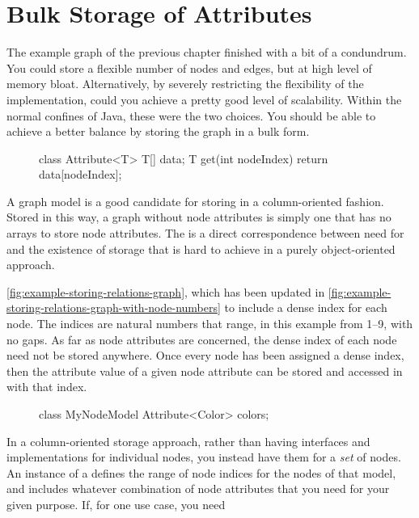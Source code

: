 \section{Bulk Storage of Attributes}

The example graph of the previous chapter finished with a bit of a condundrum.
You could store a flexible number of nodes and edges, but at high level of
memory bloat. Alternatively, by severely restricting the flexibility of the
implementation, could you achieve a pretty good level of scalability. Within the
normal confines of Java, these were the two choices. You should be able to
achieve a better balance by storing the graph in a bulk form.

\begin{figure}
\vspace{-2mm}
\begin{framedlisting}
class Attribute<T> {
  T[] data;
  T get(int nodeIndex) {
     return data[nodeIndex];
  }
}
\end{framedlisting}
\end{figure}
A graph model is a good candidate for storing in a column-oriented fashion.
Stored in this way, a graph without node attributes is simply one that has no
arrays to store node attributes. The is a direct correspondence between need for
and the existence of storage that is hard to achieve in a purely object-oriented
approach.

\autoref{fig:example-storing-relations-graph}, which has been updated in
\autoref{fig:example-storing-relations-graph-with-node-numbers} to include a
dense index for each node. The indices are natural numbers that range, in this
example from 1--9, with no gaps. As far as node attributes are concerned, the
dense index of each node need not be stored anywhere. Once every node has been
assigned a dense index, then the attribute value of a given node attribute can
be stored and accessed in with that index.

\begin{figure}
\vspace{-3mm}
\begin{framedlisting}
class MyNodeModel {
  Attribute<Color> colors;
}
\end{framedlisting}
\end{figure}
In a column-oriented storage approach, rather than having interfaces and
implementations for individual nodes, you instead have them for a
\emph{set} of nodes. An instance of a  
defines the range of node indices for the nodes of that model, and
includes whatever combination
of node attributes that you need for your given purpose. If, for one use case,
you need 


